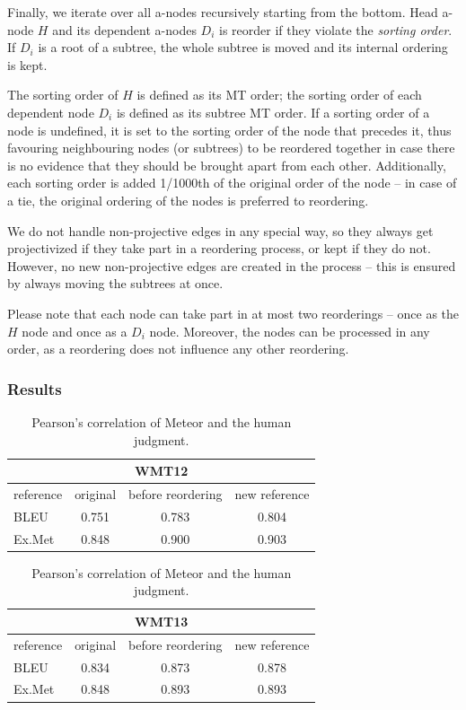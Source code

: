 \documentclass[11pt]{article}
\begin{document}
Finally, we iterate over all a-nodes recursively starting from the bottom. Head 
a-node $H$ and its dependent a-nodes $D_i$ is reorder if they violate the
\emph{sorting order}. If $D_i$ is a root of a subtree, the whole subtree is 
moved and its internal ordering is kept.

The sorting order of $H$ is defined as its MT order; the sorting order of each 
dependent node $D_i$ is defined as its subtree MT order. If a sorting order of 
a node is undefined, it is set to the sorting order of the node that precedes 
it, thus favouring neighbouring nodes (or subtrees) to be reordered together in 
case there is no evidence that they should be brought apart from each other. 
Additionally, each sorting order is added 1/1000th of the original order of the 
node -- in case of a tie, the original ordering of the nodes is preferred to 
reordering.

We do not handle non-projective edges in any special way, so they always get 
projectivized if they take part in a reordering process, or kept if they do
not. However, no new non-projective edges are created in the process – this is
ensured by always moving the subtrees at once.

Please note that each node can take part in at most two reorderings – once
as the $H$ node and once as a $D_i$ node. Moreover, the nodes can be processed 
in any order, as a reordering does not influence any other reordering.

\subsubsection{Results}
\begin{table}[tb]
\begin{center}
\begin{tabular}{l|ccc}
\multicolumn{4}{c}{\textbf{WMT12}}\\
\hline
reference & original & before reordering & new reference \\
\hline
BLEU & 0.751 & 0.783  & 0.804 \\
Ex.Met & 0.848 & 0.900 & 0.903 \\
\end{tabular} 

\quad

\begin{tabular}{l|ccc}
\multicolumn{4}{c}{\textbf{WMT13}}\\
\hline
reference & original & before reordering & new reference \\
\hline
BLEU & 0.834 &  0.873 & 0.878 \\
Ex.Met & 0.848 & 0.893 &  0.893\\
\end{tabular}

\caption{Pearson's correlation of Meteor and the human judgment.}
\label{treex_results:12:13}
\end{center}
\end{table}
\end{document}
